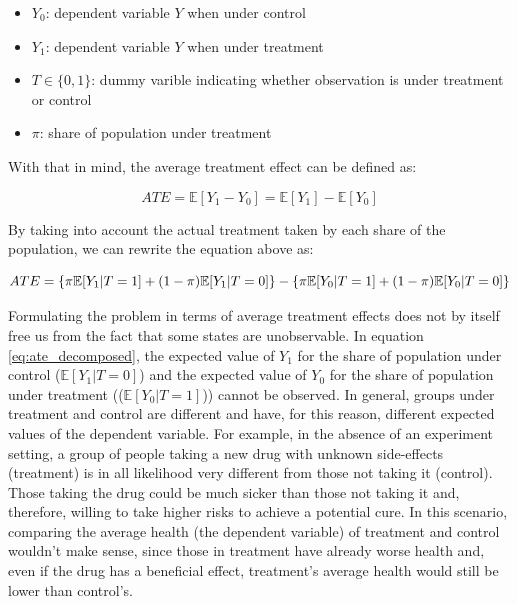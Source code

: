 \begin{itemize}
  \item $Y_0$: dependent variable $Y$ when under control
  \item $Y_1$: dependent variable $Y$ when under treatment
  \item $T \in \{0,1\}$: dummy varible indicating whether observation is under treatment or control
  \item $\pi$: share of population under treatment
\end{itemize}

With that in mind, the average treatment effect can be defined as:

\begin{equation}
  ATE = \mathbb{E}[Y_1 - Y_0] = \mathbb{E}[Y_1] - \mathbb{E}[Y_0]
\end{equation}

By taking into account the actual treatment taken by each share of the population, we can rewrite the equation above as:

\begin{equation}
  \label{eq:ate_decomposed}
    ATE = \{\pi \mathbb{E}[Y_1 | T = 1] + (1-\pi) \mathbb{E}[Y_1 | T = 0]\} \\
    - \{\pi \mathbb{E}[Y_0 | T = 1] + (1-\pi) \mathbb{E}[Y_0 | T = 0]\}
\end{equation}

Formulating the problem in terms of average treatment effects does not by itself free us from the fact that some states are unobservable. In equation \ref{eq:ate_decomposed}, the expected value of $Y_1$ for the share of population under control  ($\mathbb{E}[Y_1 | T = 0]$)  and the expected value of $Y_0$ for the share of population under treatment (($\mathbb{E}[Y_0 | T = 1]$)) cannot be observed. In general, groups under treatment and control are different and have, for this reason, different expected values of the dependent variable. For example, in the absence of an experiment setting, a group of people taking a new drug with unknown side-effects (treatment) is in all likelihood very different from those not taking it (control). Those taking the drug could be much sicker than those not taking it and, therefore, willing to take higher risks to achieve a potential cure. In this scenario, comparing the average health (the dependent variable) of treatment and control wouldn't make sense, since those in treatment have already worse health and, even if the drug has a beneficial effect, treatment's average health would still be lower than control's.

